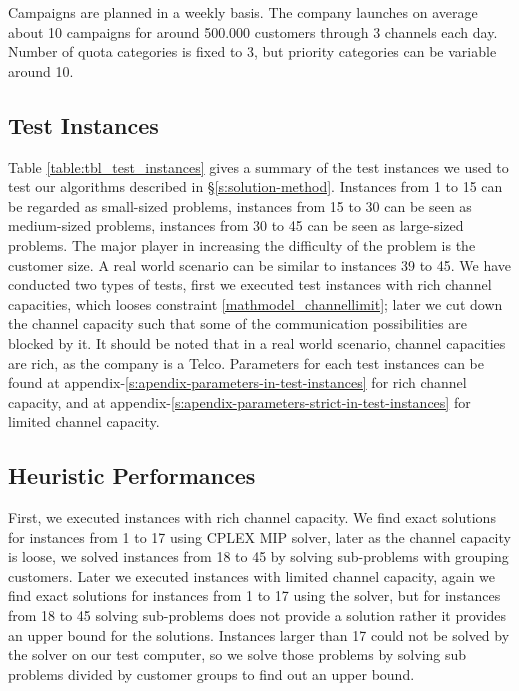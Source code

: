 \documentclass[11pt]{article}
\begin{document}
Campaigns are planned in a weekly basis. The company launches on average about 10 campaigns for around 500.000 customers through 3 channels each day. Number of quota categories is fixed to 3, but priority categories can be variable around 10.

\subsection{Test Instances} \label{test_cases}
Table \ref{table:tbl_test_instances} gives a summary of the test instances we used to test our algorithms described in \S \ref{s:solution-method}. Instances from 1 to 15 can be regarded as small-sized problems, instances from 15 to 30 can be seen as medium-sized problems, instances from 30 to 45 can be seen as large-sized problems. The major player in increasing the difficulty of the problem is the customer size. A real world scenario can be similar to instances 39 to 45. We have conducted two types of tests, first we executed test instances with rich channel capacities, which looses constraint \eqref{mathmodel_channellimit}; later we cut down the channel capacity such that some of the communication possibilities are blocked by it. It should be noted that in a real world scenario, channel capacities are rich, as the company is a Telco. Parameters for each test instances can be found at appendix-\ref{s:apendix-parameters-in-test-instances} for rich channel capacity, and at appendix-\ref{s:apendix-parameters-strict-in-test-instances} for limited channel capacity.\\

\begin{table}[htb!]
\end{table}
\clearpage

\subsection{Heuristic Performances} \label{s:test_evaluation}
First, we executed instances with rich channel capacity. We find exact solutions for instances from 1 to 17 using CPLEX MIP solver, later as the channel capacity is loose, we solved instances from 18 to 45 by solving sub-problems with grouping customers. Later we executed instances with limited channel capacity, again we find exact solutions for instances from 1 to 17 using the solver, but for instances from 18 to 45 solving sub-problems does not provide a solution rather it provides an upper bound for the solutions. Instances larger than 17 could not be solved by the solver on our test computer, so we solve those problems by solving sub problems divided by customer groups to find out an upper bound.
\end{document}
